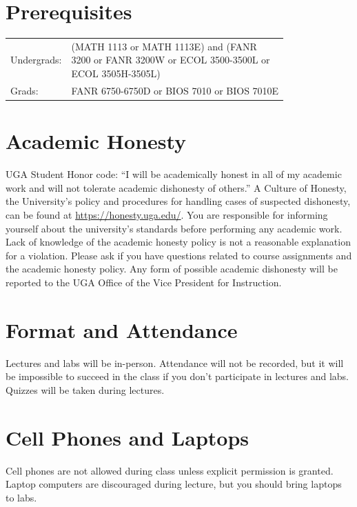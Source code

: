 \documentclass[12pt]{article}
\begin{document}
\vspace{-3mm}
\section*{\normalsize Prerequisites}
\vspace{-4mm}

\begin{tabular}{lp{0.8\linewidth}}
  Undergrads:& (MATH 1113 or MATH 1113E) and (FANR 3200 or FANR 3200W or
  ECOL 3500-3500L or ECOL 3505H-3505L) \\
  Grads:& FANR 6750-6750D or BIOS 7010 or BIOS 7010E \\
\end{tabular}



\vspace{-2mm}
\section*{\normalsize Academic Honesty}
\vspace{-4mm}

UGA Student Honor code: ``I will be academically honest in all of my
academic work and will not tolerate academic dishonesty of others.'' A
Culture of Honesty, the University's policy and procedures for
handling cases of suspected dishonesty, can be found at
\url{https://honesty.uga.edu/}. You are responsible for 
informing yourself about the university's standards before performing
any academic work. Lack of knowledge of the academic honesty policy is
not a reasonable explanation for a violation. Please ask if you have
questions related to course assignments and the academic honesty
policy. Any form of possible academic dishonesty will be reported to
the UGA Office of the Vice President for Instruction.


\section*{\normalsize Format and Attendance}
\vspace{-4mm}
Lectures and labs will be in-person. Attendance will not be recorded, but it
will be impossible to succeed in the class if you don't participate in
lectures and labs. Quizzes will be taken during lectures. 

\section*{\normalsize Cell Phones and Laptops}
\vspace{-4mm}
Cell phones are not allowed during class unless explicit permission is
granted. Laptop computers are discouraged during lecture, but you
should bring laptops to labs.
\end{document}
